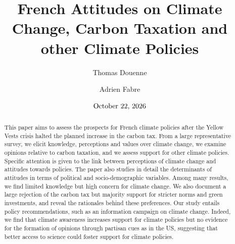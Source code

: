 \documentclass[english,5p,authoryear]{elsarticle}
\begin{document}
\sloppy

\date{$\textnormal{\today}$}

\begin{frontmatter}{}
  \title{French Attitudes on Climate Change, Carbon Taxation and other Climate Policies
  }


\author[1]{Thomas Douenne}
\author[1]{Adrien Fabre}
\address[1]{Paris School of Economics; Université Paris 1 Panthéon-Sorbonne. 48 Boulevard Jourdan, 75014, Paris, France.}


\begin{abstract}
This paper aims to assess the prospects for French climate policies after the Yellow Vests crisis halted the planned increase in the carbon tax. From a large representative survey, we elicit knowledge, perceptions and values over climate change, we examine opinions relative to carbon taxation, and we assess support for other climate policies. Specific attention is given to the link between perceptions of climate change and attitudes towards policies. The paper also studies in detail the determinants of attitudes in terms of political and socio-demographic variables. Among many results, we find limited knowledge but high concern for climate change. We also document a large rejection of the carbon tax but majority support for stricter norms and green investments, and reveal the rationales behind these preferences. Our study entails policy recommendations, such as an information campaign on climate change. Indeed, we find that climate awareness increases support for climate policies but no evidence for the formation of opinions through partisan cues as in the US, suggesting that better access to science could foster support for climate policies.
\end{abstract}




\end{frontmatter}
\end{document}

